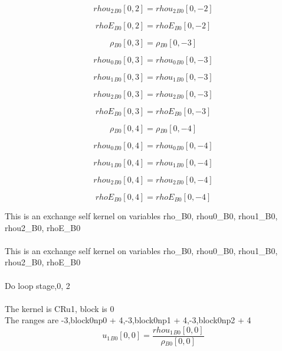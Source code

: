 \documentclass{article}
\begin{document}
\begin{dmath}{rhou_{2}{_{B0}}}[{0,2}] = {rhou_{2}{_{B0}}}[{0,-2}]\end{dmath}

\begin{dmath}{rhoE{_{B0}}}[{0,2}] = {rhoE{_{B0}}}[{0,-2}]\end{dmath}

\begin{dmath}{\rho{_{B0}}}[{0,3}] = {\rho{_{B0}}}[{0,-3}]\end{dmath}

\begin{dmath}{rhou_{0}{_{B0}}}[{0,3}] = {rhou_{0}{_{B0}}}[{0,-3}]\end{dmath}

\begin{dmath}{rhou_{1}{_{B0}}}[{0,3}] = {rhou_{1}{_{B0}}}[{0,-3}]\end{dmath}

\begin{dmath}{rhou_{2}{_{B0}}}[{0,3}] = {rhou_{2}{_{B0}}}[{0,-3}]\end{dmath}

\begin{dmath}{rhoE{_{B0}}}[{0,3}] = {rhoE{_{B0}}}[{0,-3}]\end{dmath}

\begin{dmath}{\rho{_{B0}}}[{0,4}] = {\rho{_{B0}}}[{0,-4}]\end{dmath}

\begin{dmath}{rhou_{0}{_{B0}}}[{0,4}] = {rhou_{0}{_{B0}}}[{0,-4}]\end{dmath}

\begin{dmath}{rhou_{1}{_{B0}}}[{0,4}] = {rhou_{1}{_{B0}}}[{0,-4}]\end{dmath}

\begin{dmath}{rhou_{2}{_{B0}}}[{0,4}] = {rhou_{2}{_{B0}}}[{0,-4}]\end{dmath}

\begin{dmath}{rhoE{_{B0}}}[{0,4}] = {rhoE{_{B0}}}[{0,-4}]\end{dmath}

\noindent This is an exchange self kernel on variables rho_B0, rhou0_B0, rhou1_B0, rhou2_B0, rhoE_B0\\\\\noindent This is an exchange self kernel on variables rho_B0, rhou0_B0, rhou1_B0, rhou2_B0, rhoE_B0\\\\\noindent Do loop stage,0, 2\\
\\\noindent The kernel is CRu1, block is 0\\\noindent The ranges are -3,block0np0 + 4,-3,block0np1 + 4,-3,block0np2 + 4\\\begin{dmath}{u_{1}{_{B0}}}[{0,0}] = \frac{{rhou_{1}{_{B0}}}[{0,0}]}{{\rho{_{B0}}}[{0,0}]}\end{dmath}
\end{document}
